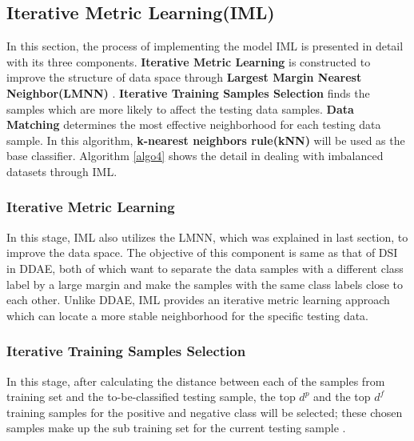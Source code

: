 \subsection{Iterative Metric Learning(IML)}
In this section, the process of implementing the model IML \cite{72} is presented in detail with its three components. \textbf{Iterative Metric Learning} is constructed to improve the structure of data space through \textbf{Largest Margin Nearest Neighbor(LMNN)} \cite{69}. \textbf{Iterative Training Samples Selection} finds the samples which are more likely to affect the testing data samples. \textbf{Data Matching} determines the most effective neighborhood for each testing data sample. In this algorithm, \textbf{k-nearest neighbors rule(kNN)} \cite{75} will be used as the base classifier. Algorithm \ref{algo4} shows the detail in dealing with imbalanced datasets through IML.

\subsubsection{Iterative Metric Learning}
In this stage, IML also utilizes the LMNN, which was explained in last section, to improve the data space. The objective of this component is same as that of DSI in DDAE, both of which want to separate the data samples with a different class label by a large margin and make the samples with the same class labels close to each other. Unlike DDAE, IML provides an iterative metric learning approach which can locate a more stable neighborhood for the specific testing data.

\subsubsection{Iterative Training Samples Selection}
In this stage, after calculating the distance between each of the samples from training set and the to-be-classified testing sample, the top $d^{p}$ and the top $d^{f}$ training samples for the positive and negative class will be selected; these chosen samples make up the sub training set for the current testing sample \cite{72}.

